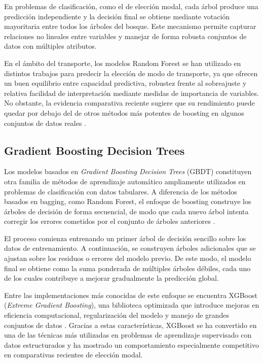 En problemas de clasificación, como el de elección modal, cada árbol produce una predicción independiente y la decisión final se obtiene mediante votación mayoritaria entre todos los árboles del bosque. Este mecanismo permite capturar relaciones no lineales entre variables y manejar de forma robusta conjuntos de datos con múltiples atributos.

En el ámbito del transporte, los modelos Random Forest se han utilizado en distintos trabajos para predecir la elección de modo de transporte, ya que ofrecen un buen equilibrio entre capacidad predictiva, robustez frente al sobreajuste y relativa facilidad de interpretación mediante medidas de importancia de variables. No obstante, la evidencia comparativa reciente sugiere que su rendimiento puede quedar por debajo del de otros métodos más potentes de boosting en algunos conjuntos de datos reales \cite{MartinBaos2023TRC}.

\subsection{Gradient Boosting Decision Trees}

Los modelos basados en \textit{Gradient Boosting Decision Trees} (GBDT) constituyen otra familia de métodos de aprendizaje automático ampliamente utilizados en problemas de clasificación con datos tabulares. A diferencia de los métodos basados en bagging, como Random Forest, el enfoque de boosting construye los árboles de decisión de forma secuencial, de modo que cada nuevo árbol intenta corregir los errores cometidos por el conjunto de árboles anteriores \cite{Friedman2001}.

El proceso comienza entrenando un primer árbol de decisión sencillo sobre los datos de entrenamiento. A continuación, se construyen árboles adicionales que se ajustan sobre los residuos o errores del modelo previo. De este modo, el modelo final se obtiene como la suma ponderada de múltiples árboles débiles, cada uno de los cuales contribuye a mejorar gradualmente la predicción global.

Entre las implementaciones más conocidas de este enfoque se encuentra XGBoost (\textit{Extreme Gradient Boosting}), una biblioteca optimizada que introduce mejoras en eficiencia computacional, regularización del modelo y manejo de grandes conjuntos de datos \cite{Chen2016XGBoost}. Gracias a estas características, XGBoost se ha convertido en una de las técnicas más utilizadas en problemas de aprendizaje supervisado con datos estructurados y ha mostrado un comportamiento especialmente competitivo en comparativas recientes de elección modal.

